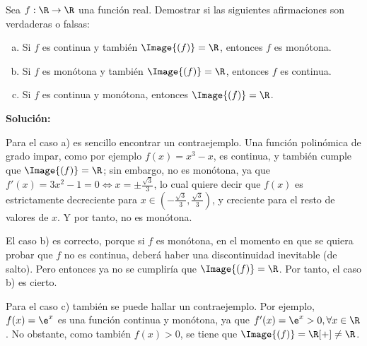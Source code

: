 \documentclass[../../main.tex]{subfiles}
\begin{document}
  \begin{shaded}
    Sea $f: \R \to \R$ una función real. Demostrar si las siguientes afirmaciones son verdaderas o falsas:

    \begin{enumerate}[a)]
      \item Si $f$ es continua y también $\Image{(f)} = \R$, entonces $f$ es monótona.
      \item Si $f$ es monótona y también $\Image{(f)} = \R$, entonces $f$ es continua.
      \item Si $f$ es continua y monótona, entonces $\Image{(f)} = \R$.
    \end{enumerate}
  \end{shaded}

  \textbf{Solución:}

  Para el caso a) es sencillo encontrar un contraejemplo. Una función polinómica de grado impar, como por ejemplo $f(x) = x^3 - x$, es continua, y también cumple que $\Image{(f)} = \R$; sin embargo, no es monótona, ya que $f'(x) = 3x^2 - 1 = 0 \iff x = \pm \displaystyle\frac{\sqrt{3}}{3}$, lo cual quiere decir que $f(x)$ es estrictamente decreciente para $x \in \left(-\displaystyle\frac{\sqrt{3}}{3}, \displaystyle\frac{\sqrt{3}}{3}\right)$, y creciente para el resto de valores de $x$. Y por tanto, no es monótona.

  El caso b) es correcto, porque si $f$ es monótona, en el momento en que se quiera probar que $f$ no es continua, deberá haber una discontinuidad inevitable (de salto). Pero entonces ya no se cumpliría que $\Image{(f)} = \R$. Por tanto, el caso b) es cierto.

  Para el caso c) también se puede hallar un contraejemplo. Por ejemplo, $f(x) = \e^x$ es una función continua y monótona, ya que $f'(x) = \e^x > 0, \forall x \in \R$. No obstante, como también $f(x) > 0$, se tiene que $\Image{(f)} = \R[+] \ne \R$.
\end{document}
